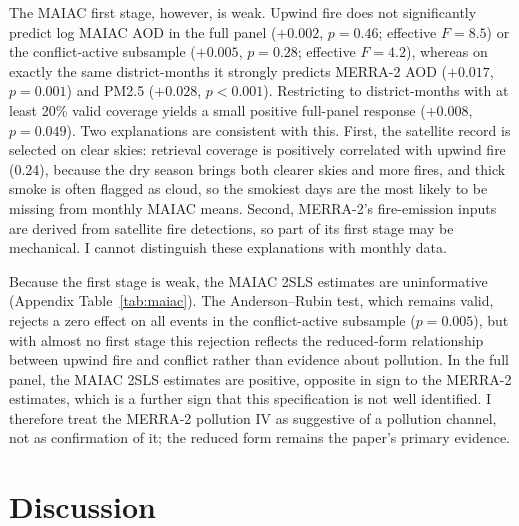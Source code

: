 \documentclass[12pt]{article}
\begin{document}
The MAIAC first stage, however, is weak. Upwind fire does not significantly predict log MAIAC AOD in the full panel ($+0.002$, $p=0.46$; effective $F = 8.5$) or the conflict-active subsample ($+0.005$, $p=0.28$; effective $F = 4.2$), whereas on exactly the same district-months it strongly predicts MERRA-2 AOD ($+0.017$, $p=0.001$) and PM2.5 ($+0.028$, $p<0.001$). Restricting to district-months with at least 20\% valid coverage yields a small positive full-panel response ($+0.008$, $p=0.049$). Two explanations are consistent with this. First, the satellite record is selected on clear skies: retrieval coverage is positively correlated with upwind fire (0.24), because the dry season brings both clearer skies and more fires, and thick smoke is often flagged as cloud, so the smokiest days are the most likely to be missing from monthly MAIAC means. Second, MERRA-2's fire-emission inputs are derived from satellite fire detections, so part of its first stage may be mechanical. I cannot distinguish these explanations with monthly data.

Because the first stage is weak, the MAIAC 2SLS estimates are uninformative (Appendix Table~\ref{tab:maiac}). The Anderson--Rubin test, which remains valid, rejects a zero effect on all events in the conflict-active subsample ($p=0.005$), but with almost no first stage this rejection reflects the reduced-form relationship between upwind fire and conflict rather than evidence about pollution. In the full panel, the MAIAC 2SLS estimates are positive, opposite in sign to the MERRA-2 estimates, which is a further sign that this specification is not well identified. I therefore treat the MERRA-2 pollution IV as suggestive of a pollution channel, not as confirmation of it; the reduced form remains the paper's primary evidence.

\section{Discussion}
\label{sec:discussion}
\end{document}
